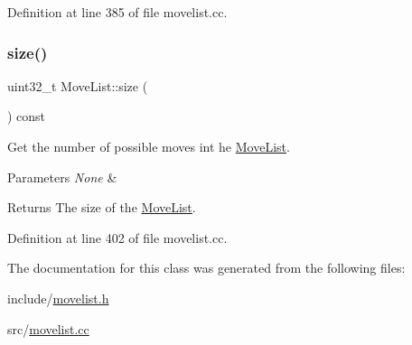 Definition at line 385 of file movelist.\+cc.

\mbox{\label{classMoveList_a4975d53e1bca9fde5bbc9d02242f18e7}} 
\subsubsection{\texorpdfstring{size()}{size()}}
{\footnotesize\ttfamily uint32\+\_\+t Move\+List\+::size (\begin{DoxyParamCaption}{ }\end{DoxyParamCaption}) const\hspace{0.3cm}{\ttfamily [noexcept]}}



Get the number of possible moves int he \mbox{\hyperlink{classMoveList}{Move\+List}}. 


\begin{DoxyParams}{Parameters}
{\em None} & \\
\hline
\end{DoxyParams}
\begin{DoxyReturn}{Returns}
The size of the \mbox{\hyperlink{classMoveList}{Move\+List}}. 
\end{DoxyReturn}


Definition at line 402 of file movelist.\+cc.



The documentation for this class was generated from the following files\+:\begin{DoxyCompactItemize}
\item 
include/\mbox{\hyperlink{movelist_8h}{movelist.\+h}}\item 
src/\mbox{\hyperlink{movelist_8cc}{movelist.\+cc}}\end{DoxyCompactItemize}
